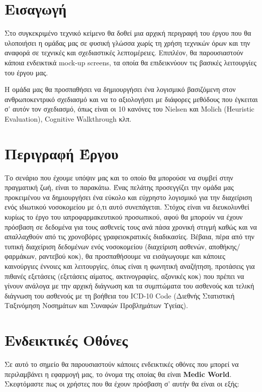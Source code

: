 \documentclass{article}
\begin{document}
{
  \hypersetup{linkcolor=black}
  \tableofcontents
}

\section{Εισαγωγή}
    Στο συγκεκριμένο τεχνικό κείμενο θα δοθεί μια αρχική περιγραφή του έργου που θα υλοποιήσει η ομάδας μας σε φυσική γλώσσα χωρίς τη χρήση τεχνικών όρων και την αναφορά σε τεχνικές και σχεδιαστικές λεπτομέρειες. Επιπλέον, θα παρουσιαστούν κάποια ενδεικτικά mock-up screens, τα οποία θα επιδεικνύουν τις βασικές λειτουργίες του έργου μας. \par
    H ομάδα μας θα προσπαθήσει να δημιουργήσει ένα λογισμικό βασιζόμενη στον ανθρωποκεντρικό σχεδιασμό και να το αξιολογήσει με διάφορες μεθόδους που έγκειται σ' αυτόν τον σχεδιασμό, όπως είναι οι 10 κανόνες του Nielsen και Molich (Heuristic Evaluation), Cognitive Walkthrough κλπ.
    

\section{Περιγραφή Έργου}

Το σενάριο που έχουμε υπόψιν μας και το οποίο θα μπορούσε να συμβεί στην πραγματική ζωή, είναι το παρακάτω. Ένας πελάτης προσεγγίζει την ομάδα μας προκειμένου να δημιουργήσει ένα εύκολο και εύχρηστο λογισμικό για την διαχείριση ενός ιδιωτικού νοσοκομείου με ό,τι αυτό συνεπάγεται. Στόχος είναι να διευκολυνθεί κυρίως το έργο του ιατροφαρμακευτικού προσωπικού, αφού θα μπορούν να έχουν πρόσβαση σε δεδομένα για τους ασθενείς τους ανά πάσα χρονική στιγμή καθώς και να απαλλαχθούν από τις χρονοβόρες γραφειοκρατικές διαδικασίες. Βέβαια, πέρα από την τυπική διαχείριση δεδομένων ενός νοσοκομείου (διαχείριση ασθενών, αποθήκης/φαρμάκων, ραντεβού κοκ), θα προσπαθήσουμε να εισάγωγουμε και κάποιες καινούργιες έννοιες και λειτουργίες, όπως είναι η φωνητική αναζήτηση, προτάσεις για πιθανές εξετάσεις (εξετάσεις αίματος, ακτινογραφίες, αξονικές κοκ) που πρέπει να γίνουν ανάλογα με την αρχική διάγνωση και τα συμπτώματα του ασθενούς και τελική διάγνωση του ασθενούς με τη βοήθεια του ICD-10 Code (Διεθνής Στατιστική Ταξινόμηση Νοσημάτων και Συναφών Προβλημάτων Υγείας).

\section{Ενδεικτικές Οθόνες}

Σε αυτό το σημείο θα παρουσιαστούν κάποιες ενδεικτικές οθόνες που μπορεί να περιλαμβάνει η εφαρμογή μας, το όνομα της οποίας θα είναι \textbf{Medic World}. Σκεφτόμαστε πως οι χρήστες που θα έχουν πρόσβαση σ' αυτήν θα είναι οι εξής:
\end{document}

